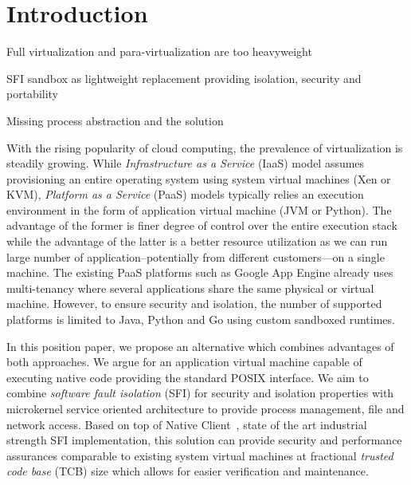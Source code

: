 \section{Introduction}
\label{sec:intro}

\begin{structure}
  \item Full virtualization and para-virtualization are too heavyweight
  \item SFI sandbox as lightweight replacement providing isolation,
    security and portability
  \item Missing process abstraction and the solution
\end{structure}


With the rising popularity of cloud computing, the prevalence of
virtualization is steadily growing. While \emph{Infrastructure as a
Service} (IaaS) model assumes provisioning an entire operating system
using system virtual machines (\eg Xen or KVM), \emph{Platform as a
Service} (PaaS) models typically relies an execution environment in the
form of application virtual machine (\eg JVM or Python). The advantage
of the former is finer degree of control over the entire execution stack
while the advantage of the latter is a better resource utilization as we
can run large number of application--potentially from different
customers---on a single machine. The existing PaaS platforms such as
Google App Engine already uses multi-tenancy where several applications
share the same physical or virtual machine.  However, to ensure security
and isolation, the number of supported platforms is limited to Java,
Python and Go using custom sandboxed runtimes.

In this position paper, we propose an alternative which combines
advantages of both approaches. We argue for an application virtual
machine capable of executing native code providing the standard POSIX
interface. We aim to combine \emph{software fault isolation} (SFI) for
security and isolation properties with microkernel service oriented
architecture to provide process management, file and network access.
Based on top of Native Client~\cite{yee:ieee-sp09}, state of the art
industrial strength SFI implementation, this solution can provide
security and performance assurances comparable to existing system
virtual machines at fractional \emph{trusted code base} (TCB) size which
allows for easier verification and maintenance. 

